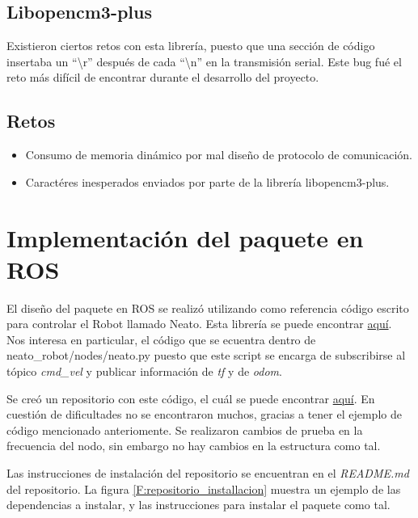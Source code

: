 \subsection{Libopencm3-plus}

Existieron ciertos retos con esta librería, puesto que una sección de código insertaba un ``\textbackslash r'' después de cada ``\textbackslash n'' en la transmisión serial. Este bug fué el reto más difícil de encontrar durante el desarrollo del proyecto.

\subsection{Retos}

\begin{itemize}
\item Consumo de memoria dinámico por mal diseño de protocolo de comunicación.
\item Caractéres inesperados enviados por parte de la librería libopencm3-plus.
\end{itemize}

\section{Implementación del paquete en ROS}

El diseño del paquete en ROS se realizó utilizando como referencia código escrito para controlar el Robot llamado Neato. Esta librería se puede encontrar \href{https://github.com/mikeferguson/neato_robot}{aquí}. Nos interesa en particular, el código que se ecuentra dentro de neato\_robot/nodes/neato.py puesto que este script se encarga de subscribirse al tópico \textit{cmd\_vel} y publicar información de \textit{tf} y de \textit{odom}.

Se creó un repositorio con este código, el cuál se puede encontrar \href{https://github.com/slealq/omnidirectional_robot}{aquí}. En cuestión de dificultades no se encontraron muchos, gracias a tener el ejemplo de código mencionado anteriomente. Se realizaron cambios de prueba en la frecuencia del nodo, sin embargo no hay cambios en la estructura como tal.

Las instrucciones de instalación del repositorio se encuentran en el \textit{README.md} del repositorio. La figura \ref{F:repositorio_installacion} muestra un ejemplo de las dependencias a instalar, y las instrucciones para instalar el paquete como tal.

